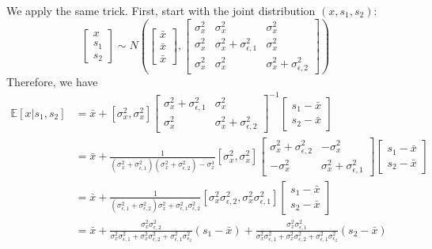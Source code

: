\documentclass[12pt]{article}
\begin{document}
We apply the same trick. First, start with the joint distribution $(x, s_1, s_2)$:
\begin{equation}
	\begin{bmatrix}
		x \\ s_1 \\ s_2
	\end{bmatrix} 
\sim N\left(\begin{bmatrix}
	\bar{x} \\ \bar{x} \\ \bar{x}
\end{bmatrix}, 
\begin{bmatrix}
	\sigma^2_x & \sigma^2_x & \sigma^2_x \\
	\sigma^2_x & \sigma^2_x + \sigma^2_{\epsilon,1} & \sigma^2_x \\
	\sigma^2_x & \sigma^2_x & \sigma^2_x + \sigma^2_{\epsilon,2}
\end{bmatrix}\right)
\end{equation}
Therefore, we have
\begin{align}
	\mathbb{E}[x|s_1, s_2] & = \bar{x} + [\sigma^2_x, \sigma^2_x] \begin{bmatrix}
		\sigma^2_x + \sigma^2_{\epsilon,1} & \sigma^2_x \\ \sigma^2_x & \sigma^2_x + \sigma^2_{\epsilon,2}
	\end{bmatrix}^{-1} \begin{bmatrix}
	s_1 - \bar{x} \\ s_2 - \bar{x}
\end{bmatrix} \nonumber \\
& = \bar{x} + \frac{1}{(\sigma^2_x + \sigma^2_{\epsilon,1})(\sigma^2_x + \sigma^2_{\epsilon,2}) - \sigma^4_x} [\sigma^2_x, \sigma^2_x] \begin{bmatrix}
	\sigma^2_x + \sigma^2_{\epsilon, 2} & - \sigma^2_x \\ -\sigma^2_x & \sigma^2_x + \sigma^2_{\epsilon, 1}\end{bmatrix}
    \begin{bmatrix}
		s_1 - \bar{x} \\ s_2 - \bar{x}
	\end{bmatrix} \nonumber \\
& = \bar{x} + \frac{1}{(\sigma^2_{\epsilon,1} + \sigma^2_{\epsilon,2}) \sigma^2_x + \sigma^2_{\epsilon,1}\sigma^2_{\epsilon,2}} [\sigma^2_x \sigma^2_{\epsilon,2}, \sigma^2_x \sigma^2_{\epsilon, 1}]
 \begin{bmatrix}
s_1 - \bar{x} \\ s_2 - \bar{x}
\end{bmatrix} \nonumber  \\
& = \bar{x} + \frac{\sigma^2_x \sigma^2_{\epsilon, 2}}{\sigma^2_x \sigma^2_{\epsilon, 1} + \sigma^2_x \sigma^2_{\epsilon, 2} + \sigma^2_{\epsilon, 1} \sigma^2_{\epsilon_2}} (s_1 - \bar{x}) + \frac{\sigma^2_x \sigma^2_{\epsilon, 1}}{\sigma^2_x \sigma^2_{\epsilon, 1} + \sigma^2_x \sigma^2_{\epsilon, 2} + \sigma^2_{\epsilon, 1} \sigma^2_{\epsilon_2}} (s_2 - \bar{x}) \label{eq:posterior_mean_2_signals}
\end{align}
\end{document}
